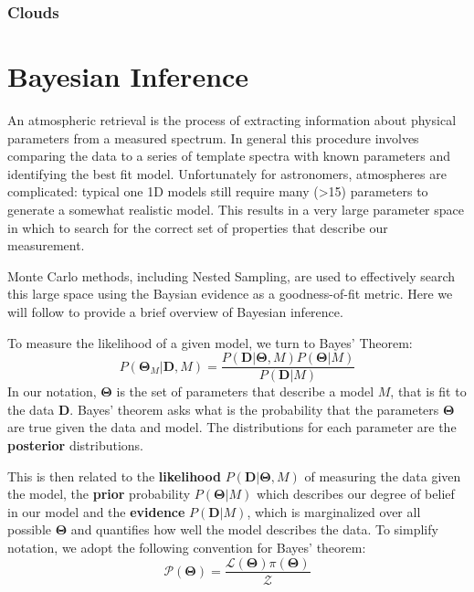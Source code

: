 \subsubsection{Clouds}
\cite{Line2016} %
\cite{Faherty2018} %
\cite{Morley2014} %
\cite{Lavie2017} %
\section{Bayesian Inference}
An atmospheric retrieval is the process of extracting information about physical parameters from a measured spectrum. 
In general this procedure involves comparing the data to a series of template spectra with known parameters and identifying the best fit model.
Unfortunately for astronomers, atmospheres are complicated: typical one 1D models still require many (>15) parameters to generate a somewhat realistic model. 
This results in a very large parameter space in which to search for the correct set of properties that describe our measurement.

Monte Carlo methods, including Nested Sampling, are used to effectively search this large space using the Baysian evidence as a goodness-of-fit metric.
Here we will follow \parencite{Speagle2019} to provide a brief overview of Bayesian inference.

To measure the likelihood of a given model, we turn to Bayes' Theorem:
\begin{equation}\label{eqn:bayes}
P(\mathbf{\Theta}_{M}|\mathbf{D},M) = \frac{P(\mathbf{D}|\mathbf{\Theta},M)P(\mathbf{\Theta}|M)}{P(\mathbf{D}|M)}
\end{equation}
In our notation, $\mathbf{\Theta}$ is the set of parameters that describe a model $M$, that is fit to the data $\mathbf{D}$. 
Bayes' theorem asks what is the probability that the parameters $\mathbf{\Theta}$ are true given the data and model. 
The distributions for each parameter are the \textbf{posterior} distributions.

This is then related to the \textbf{likelihood} $P(\mathbf{D}|\mathbf{\Theta},M)$ of measuring the data given the model, the \textbf{prior} probability $P(\mathbf{\Theta}|M)$ which describes our degree of belief in our model and the \textbf{evidence} $P(\mathbf{D}|M)$, which is marginalized over all possible $\mathbf{\Theta}$ and quantifies how well the model describes the data.
To simplify notation, we adopt the following convention for Bayes' theorem:
\begin{equation}
\mathcal{P}(\mathbf{\Theta}) = \frac{\mathcal{L}(\mathbf{\Theta})\pi(\mathbf{\Theta})}{\mathcal{Z}}
\end{equation}

